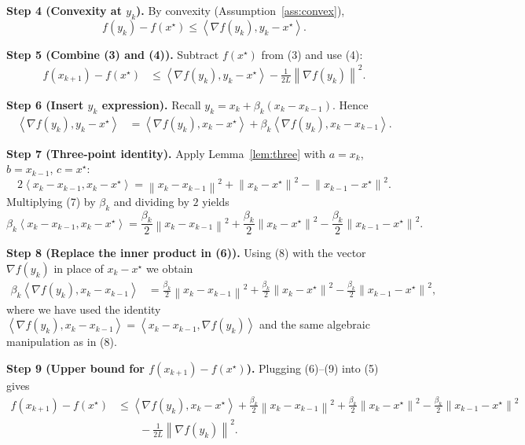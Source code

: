 \documentclass{article}
\newcommand{\norm}[1]{\left\lVert#1\right\rVert}
\newcommand{\ip}[2]{\left\langle #1,#2\right\rangle}
\begin{document}
\bigskip
\noindent\textbf{Step 4 (Convexity at $y_k$).} By convexity (Assumption~\ref{ass:convex}),
\[
f(y_k)-f(x^\star) \le \ip{\nabla f(y_k)}{y_k-x^\star}. \tag{4}
\]

\bigskip
\noindent\textbf{Step 5 (Combine (3) and (4)).} Subtract $f(x^\star)$ from (3) and use (4):
\[
\begin{aligned}
f(x_{k+1})-f(x^\star)
   &\le \ip{\nabla f(y_k)}{y_k-x^\star}
        -\frac{1}{2L}\norm{\nabla f(y_k)}^2 .
\end{aligned}
\tag{5}
\]

\bigskip
\noindent\textbf{Step 6 (Insert $y_k$ expression).} Recall $y_k = x_k + \beta_k (x_k-x_{k-1})$. Hence
\[
\begin{aligned}
\ip{\nabla f(y_k)}{y_k-x^\star}
   &= \ip{\nabla f(y_k)}{x_k-x^\star}
      +\beta_k\ip{\nabla f(y_k)}{x_k-x_{k-1}} .
\end{aligned}
\tag{6}
\]

\bigskip
\noindent\textbf{Step 7 (Three‑point identity).} Apply Lemma~\ref{lem:three} with
$a = x_k$, $b = x_{k-1}$, $c = x^\star$:
\[
2\ip{x_k-x_{k-1}}{x_k-x^\star}
   = \norm{x_k-x_{k-1}}^2 + \norm{x_k-x^\star}^2 - \norm{x_{k-1}-x^\star}^2 .
\tag{7}
\]
Multiplying (7) by $\beta_k$ and dividing by $2$ yields
\[
\beta_k\ip{x_k-x_{k-1}}{x_k-x^\star}
   = \frac{\beta_k}{2}\norm{x_k-x_{k-1}}^2
     +\frac{\beta_k}{2}\norm{x_k-x^\star}^2
     -\frac{\beta_k}{2}\norm{x_{k-1}-x^\star}^2 .
\tag{8}
\]

\bigskip
\noindent\textbf{Step 8 (Replace the inner product in (6)).} Using (8) with the vector $\nabla f(y_k)$ in place of $x_k-x^\star$ we obtain
\[
\begin{aligned}
\beta_k\ip{\nabla f(y_k)}{x_k-x_{k-1}}
   &= \frac{\beta_k}{2}\norm{x_k-x_{k-1}}^2
      +\frac{\beta_k}{2}\norm{x_k-x^\star}^2
      -\frac{\beta_k}{2}\norm{x_{k-1}-x^\star}^2 ,
\end{aligned}
\tag{9}
\]
where we have used the identity
$\ip{\nabla f(y_k)}{x_k-x_{k-1}} = \ip{x_k-x_{k-1}}{\nabla f(y_k)}$ and the same algebraic manipulation as in (8).

\bigskip
\noindent\textbf{Step 9 (Upper bound for $f(x_{k+1})-f(x^\star)$).} Plugging (6)–(9) into (5) gives
\[
\begin{aligned}
f(x_{k+1})-f(x^\star)
 &\le \ip{\nabla f(y_k)}{x_k-x^\star}
      +\frac{\beta_k}{2}\norm{x_k-x_{k-1}}^2
      +\frac{\beta_k}{2}\norm{x_k-x^\star}^2
      -\frac{\beta_k}{2}\norm{x_{k-1}-x^\star}^2 \\
 &\qquad -\frac{1}{2L}\norm{\nabla f(y_k)}^2 .
\end{aligned}
\tag{10}
\]
\end{document}
